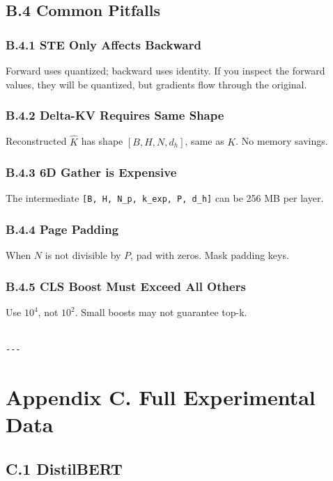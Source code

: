 \subsection{B.4 Common Pitfalls}

\subsubsection{B.4.1 STE Only Affects Backward}

Forward uses quantized; backward uses identity. If you inspect the forward 
values, they will be quantized, but gradients flow through the original.

\subsubsection{B.4.2 Delta-KV Requires Same Shape}

Reconstructed $\hat{K}$ has shape $[B, H, N, d_h]$, same as $K$. No memory 
savings.

\subsubsection{B.4.3 6D Gather is Expensive}

The intermediate \texttt{[B, H, N\_p, k\_exp, P, d\_h]} can be 256 MB per layer.

\subsubsection{B.4.4 Page Padding}

When $N$ is not divisible by $P$, pad with zeros. Mask padding keys.

\subsubsection{B.4.5 CLS Boost Must Exceed All Others}

Use $10^4$, not $10^2$. Small boosts may not guarantee top-k.
\begin{lstlisting}

---
\end{lstlisting}

\section{Appendix C. Full Experimental Data}

\subsection{C.1 DistilBERT}

